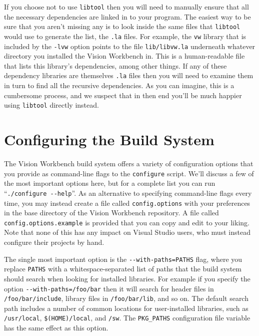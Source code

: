 If you choose not to use \verb#libtool# then you will need to manually
ensure that all the necessary dependencies are linked in to your
program.  The easiest way to be sure that you aren't missing any is to
look inside the same files that \verb#libtool# would use to generate
the list, the \verb#.la# files.  For example, the \verb#vw# library
that is included by the \verb#-lvw# option points to the file
\verb#lib/libvw.la# underneath whatever directory you installed the
Vision Workbench in.  This is a human-readable file that lists this
library's dependencies, among other things.  If any of these
dependency libraries are themselves \verb#.la# files then you will
need to examine them in turn to find all the recursive dependencies.
As you can imagine, this is a cumbersome process, and we suspect that
in then end you'll be much happier using \verb#libtool# directly
instead.

\begin{center}
\end{center}

\section{Configuring the Build System}\label{sec:config-build}

The Vision Workbench build system offers a variety of configuration
options that you provide as command-line flags to the \verb#configure#
script.  We'll discuss a few of the most important options here, but
for a complete list you can run ``\verb#./configure --help#''.  As an
alternative to specifying command-line flags every time, you may
instead create a file called \verb#config.options# with your
preferences in the base directory of the Vision Workbench repository.
A file called \verb#config.options.example# is provided that you can
copy and edit to your liking.  Note that none of this has any impact
on Visual Studio users, who must instead configure their projects by
hand.

The single most important option is the \verb#--with-paths=PATHS# 
flag, where you replace \verb#PATHS# with a whitespace-separated list of 
paths that the build system should search when looking for installed 
libraries.  For example if you specify the option \verb#--with-paths=/foo/bar# 
then it will search for header files in \verb#/foo/bar/include#, library 
files in \verb#/foo/bar/lib#, and so on.  The default search path includes 
a number of common locations for user-installed libraries, such as 
\verb#/usr/local#, \verb#$(HOME)/local#, and \verb#/sw#.  The \verb#PKG_PATHS# 
configuration file variable has the same effect as this option.

